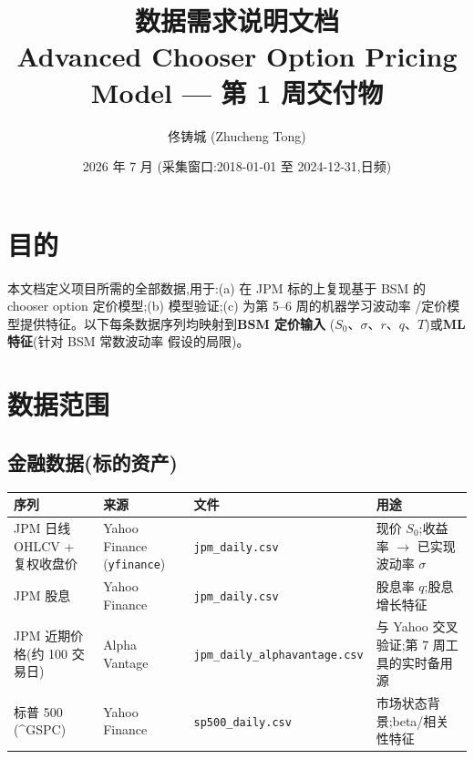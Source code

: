 \documentclass[11pt]{ctexart}
\title{\textbf{数据需求说明文档}\\
\large Advanced Chooser Option Pricing Model --- 第 1 周交付物}
\author{佟铸城 (Zhucheng Tong)}
\date{2026 年 7 月 \quad(采集窗口:2018-01-01 至 2024-12-31,日频)}
\begin{document}
\maketitle

\section{目的}
本文档定义项目所需的全部数据,用于:(a) 在 JPM 标的上复现基于 BSM 的
chooser option 定价模型;(b) 模型验证;(c) 为第 5--6 周的机器学习波动率
/定价模型提供特征。以下每条数据序列均映射到\textbf{BSM 定价输入}
($S_0$、$\sigma$、$r$、$q$、$T$)或\textbf{ML 特征}(针对 BSM 常数波动率
假设的局限)。

\section{数据范围}

\subsection{金融数据(标的资产)}
\begin{center}
\small
\begin{tabular}{p{3.3cm} p{2.5cm} p{3.9cm} p{4.3cm}}
\toprule
\textbf{序列} & \textbf{来源} & \textbf{文件} & \textbf{用途} \\
\midrule
JPM 日线 OHLCV + 复权收盘价 & Yahoo Finance (\texttt{yfinance}) & \texttt{jpm\_daily.csv} & 现价 $S_0$;收益率 $\to$ 已实现波动率 $\sigma$ \\
JPM 股息 & Yahoo Finance & \texttt{jpm\_daily.csv} & 股息率 $q$;股息增长特征 \\
JPM 近期价格(约 100 交易日) & Alpha Vantage & \texttt{jpm\_daily\_\newline alphavantage.csv} & 与 Yahoo 交叉验证;第 7 周工具的实时备用源 \\
标普 500 (\^{}GSPC) & Yahoo Finance & \texttt{sp500\_daily.csv} & 市场状态背景;beta/相关性特征 \\
\bottomrule
\end{tabular}
\end{center}
\end{document}
